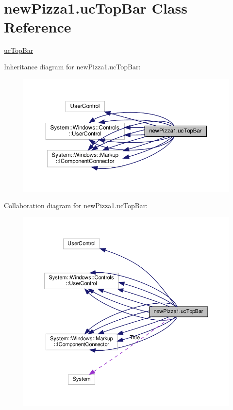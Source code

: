 \hypertarget{classnewPizza1_1_1ucTopBar}{}\section{new\+Pizza1.\+uc\+Top\+Bar Class Reference}
\label{classnewPizza1_1_1ucTopBar}


\hyperlink{classnewPizza1_1_1ucTopBar}{uc\+Top\+Bar}  




Inheritance diagram for new\+Pizza1.\+uc\+Top\+Bar\+:
\nopagebreak
\begin{figure}[H]
\begin{center}
\leavevmode
\includegraphics[width=350pt]{classnewPizza1_1_1ucTopBar__inherit__graph}
\end{center}
\end{figure}


Collaboration diagram for new\+Pizza1.\+uc\+Top\+Bar\+:
\nopagebreak
\begin{figure}[H]
\begin{center}
\leavevmode
\includegraphics[width=350pt]{classnewPizza1_1_1ucTopBar__coll__graph}
\end{center}
\end{figure}
